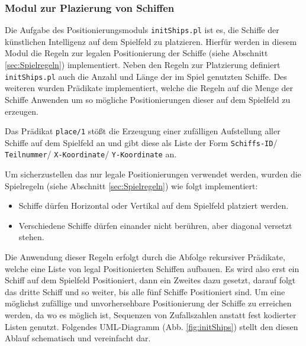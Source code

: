 \subsubsection{Modul zur Plazierung von Schiffen} \label{sec:initships}	
	Die Aufgabe des Positionierungsmoduls \texttt{initShips.pl} ist es, die Schiffe der künstlichen Intelligenz auf dem Spielfeld zu platzieren.
	Hierfür werden in diesem Modul die Regeln zur legalen Positionierung der Schiffe (siehe Abschnitt \ref{sec:Spielregeln}) implementiert. Neben den Regeln 
	zur Platzierung definiert \texttt{initShips.pl} auch die Anzahl und Länge der im Spiel genutzten Schiffe. Des weiteren wurden Prädikate implementiert, 
	welche die Regeln auf die Menge der Schiffe Anwenden um so mögliche Positionierungen dieser auf dem Spielfeld zu erzeugen.
	
	Das Prädikat \texttt{place/1} stößt die Erzeugung einer zufälligen Aufstellung aller Schiffe auf dem Spielfeld an und gibt diese als Liste der Form 
	\texttt{Schiffs-ID}/ \texttt{Teilnummer}/ \texttt{X-Koordinate}/ \texttt{Y-Koordinate} an.
	
	Um sicherzustellen das nur legale Positionierungen verwendet werden, wurden die Spielregeln (siehe Abschnitt \ref{sec:Spielregeln}) wie folgt implementiert:
	\begin{itemize}
		\item Schiffe dürfen Horizontal oder Vertikal auf dem Spielfeld platziert werden.\newline
		\lstset{language=Prolog,caption=Implementierung der Platzierungsregel in Prolog,label=code:PrologRules1,	   
		inputencoding=latin1,extendedchars=true,basicstyle=\footnotesize,numbers=left,numberstyle=\footnotesize}
		
		\item Verschiedene Schiffe dürfen einander nicht berühren, aber diagonal versetzt stehen.
		\lstset{language=Prolog,caption=Implementierung der Platzierungsregel in Prolog,label=code:PrologRules2,	   
		inputencoding=latin1,extendedchars=true,basicstyle=\footnotesize,numbers=left,numberstyle=\footnotesize}
		
	\end{itemize}
	Die Anwendung dieser Regeln erfolgt durch die Abfolge rekursiver Prädikate, welche eine Liste von legal Positionierten Schiffen aufbauen. Es wird also 
	erst ein Schiff auf dem Spielfeld Positioniert, dann ein Zweites dazu gesetzt, darauf folgt das dritte Schiff und so weiter, bis alle fünf Schiffe Positioniert 
	sind. Um eine möglichst zufällige und unvorhersehbare Positionierung der Schiffe zu erreichen werden, da wo es möglich ist, Sequenzen von Zufallszahlen anstatt 
	fest kodierter Listen genutzt. Folgendes UML-Diagramm (Abb. \ref{fig:initShips}) stellt den diesen Ablauf schematisch und vereinfacht dar.
